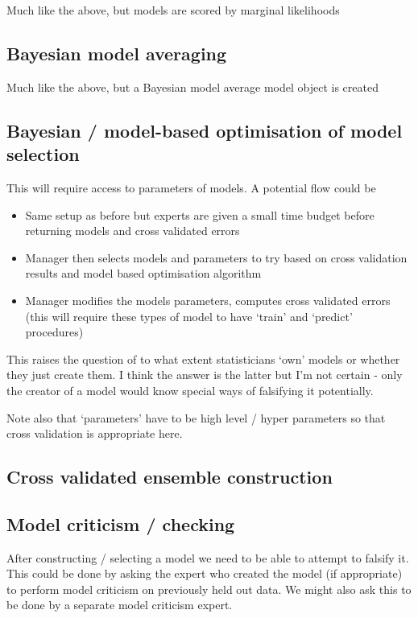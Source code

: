 \documentclass[twoside,11pt]{article}
\begin{document}
Much like the above, but models are scored by marginal likelihoods

\subsection{Bayesian model averaging}

Much like the above, but a Bayesian model average model object is created

\subsection{Bayesian / model-based optimisation of model selection}

This will require access to parameters of models.
A potential flow could be
\begin{itemize}
  \item Same setup as before but experts are given a small time budget before returning models and cross validated errors
  \item Manager then selects models and parameters to try based on cross validation results and model based optimisation algorithm
  \item Manager modifies the models parameters, computes cross validated errors (this will require these types of model to have `train' and `predict' procedures)
\end{itemize}

This raises the question of to what extent statisticians `own' models or whether they just create them.
I think the answer is the latter but I'm not certain - only the creator of a model would know special ways of falsifying it potentially.

Note also that `parameters' have to be high level / hyper parameters so that cross validation is appropriate here.

\subsection{Cross validated ensemble construction}

\subsection{Model criticism / checking}

After constructing / selecting a model we need to be able to attempt to falsify it.
This could be done by asking the expert who created the model (if appropriate) to perform model criticism on previously held out data.
We might also ask this to be done by a separate model criticism expert.
\end{document}
